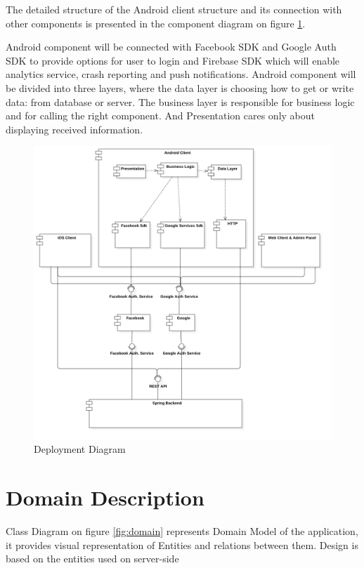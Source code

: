 \documentclass[thesis=B,english]{FITthesis}[2012/10/20]
\begin{document}
The detailed structure of the Android client structure and its connection with other components is presented in the component diagram on figure \ref{fig:deploy}. 

Android component  will be connected with Facebook SDK and Google Auth SDK to provide options for user to login and Firebase SDK which will enable analytics service, crash reporting and push notifications. Android component will be divided into three layers, where the data layer
is choosing how to get or write data: from database or server. The business layer is responsible for business logic and for calling the right component. And Presentation cares only about displaying received information.
\newpage
\begin{figure}[H]
  \includegraphics[scale=0.3]{deployment}
  \caption{Deployment Diagram}
  \label{fig:deploy}
\end{figure}


\newpage
\section{Domain Description}
 Class Diagram on figure \ref{fig:domain} represents Domain Model of the application, it provides visual representation of Entities and relations between them. Design is based on the entities used on server-side
\end{document}

